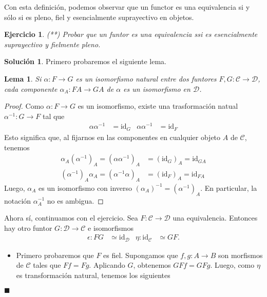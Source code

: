 \documentclass[12pt,letterpaper,titlepage]{article}
\newcommand{\xqed}[1]{%
  \leavevmode\unskip\penalty9999 \hbox{}\nobreak\hfill
  \quad\hbox{\ensuremath{#1}}}
\newtheorem{exe}{Ejercicio}
\newtheorem{lemma}{Lema}
\theoremstyle{definition}
\newtheorem*{soltemp}{Solución}
\newenvironment{sol}[1]{%
    \begin{soltemp}#1}{%
    \xqed{\blacksquare}\end{soltemp}%
}
\renewcommand\cal[1]{\mathcal{#1}}
\newcommand\<{\langle}
\renewcommand\>{\rangle}
\newcommand{\id}{\mathrm{id}}
\begin{document}
Con esta definición, podemos observar que un functor es una equivalencia si y sólo si es pleno, fiel y esencialmente suprayectivo en objetos.
\begin{exe}%
    (**) Probar que un funtor es una equivalencia ssi es
      esencialmente suprayectivo y fielmente pleno.
\end{exe}
\begin{sol}
    Primero probaremos el siguiente lema.
    \begin{lemma}
        Si $\alpha:F\to G$ es un isomorfismo natural entre dos funtores
        $F,G:\cal C\to\cal D$, cada componente $\alpha_A:FA\to GA$ de
        $\alpha$ es un isomorfismo en $\cal D$.
    \end{lemma}
    \begin{proof}
        Como $\alpha:F\to G$ es un isomorfismo, existe una trasformación
        natual $\alpha^{-1}:G\to F$ tal que
        \begin{align*}
            \alpha\alpha^{-1} &= \id_G
                & \alpha\alpha^{-1} &= \id_F
        \end{align*}
        Esto significa que, al fijarnos en
        las componentes en cualquier objeto $A$ de $\cal C$, tenemos
        \begin{align*}
                \alpha_A(\alpha^{-1})_A
                = (\alpha\alpha^{-1})_A
                &= (\id_G)_A
                = \id_{GA} \\
                (\alpha^{-1})_A\alpha_A
                =(\alpha^{-1}\alpha)_A
                &= (\id_{F})_A
                = \id_{FA}
        \end{align*}
        Luego, $\alpha_A$ es un isomorfismo con inverso
        $(\alpha_A)^{-1}=(\alpha^{-1})_A$.
        En particular, la notación $\alpha^{-1}_A$ no es ambigua.
    \end{proof}
    Ahora sí, continuamos con el ejercicio.
    Sea $F:\cal C \to \cal D$ una equivalencia.
    Entonces hay otro funtor $G:\cal D\to \cal C$ e isomorfismos
    \begin{align*}
        \epsilon : FG &\simeq \id_{\cal D} & \eta : \id_{\cal C} &\simeq GF.
    \end{align*}
    \begin{itemize}
        \item 
        Primero probaremos que $F$ es fiel.
        Supongamos que $f,g:A\to B$ son morfismos de $\cal C$ tales que
        $Ff = Fg$.
        Aplicando $G$, obtenemos $GFf=GFg$.
        Luego, como $\eta$ es transformación natural, tenemos los siguientes

\end{itemize}
\end{sol}
\end{document}
